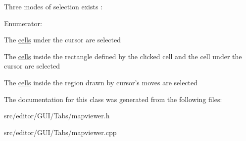 \-Three modes of selection exists \-: \begin{Desc}
\item[\-Enumerator\-: ]\par
\begin{description}
\item[{\em 
\hypertarget{class_map_viewer_a8a7a365452e5770c1fab21a9bfb0067dad92f9b8968a2dac53903589a13c4c898}{\-Pencil\-Selection}\label{class_map_viewer_a8a7a365452e5770c1fab21a9bfb0067dad92f9b8968a2dac53903589a13c4c898}
}]\-The \hyperlink{class_cell}{cells} under the cursor are selected \item[{\em 
\hypertarget{class_map_viewer_a8a7a365452e5770c1fab21a9bfb0067da551f2219d9274f32ee0d787cca9a0253}{\-Rectangle\-Selection}\label{class_map_viewer_a8a7a365452e5770c1fab21a9bfb0067da551f2219d9274f32ee0d787cca9a0253}
}]\-The \hyperlink{class_cell}{cells} inside the rectangle defined by the clicked cell and the cell under the cursor are selected \item[{\em 
\hypertarget{class_map_viewer_a8a7a365452e5770c1fab21a9bfb0067da73f86e7956b7b2b6013ce0e20fa5eea0}{\-Region\-Selection}\label{class_map_viewer_a8a7a365452e5770c1fab21a9bfb0067da73f86e7956b7b2b6013ce0e20fa5eea0}
}]\-The \hyperlink{class_cell}{cells} inside the region drawn by cursor's moves are selected \end{description}
\end{Desc}



\-The documentation for this class was generated from the following files\-:\begin{DoxyCompactItemize}
\item 
src/editor/\-G\-U\-I/\-Tabs/mapviewer.\-h\item 
src/editor/\-G\-U\-I/\-Tabs/mapviewer.\-cpp\end{DoxyCompactItemize}
